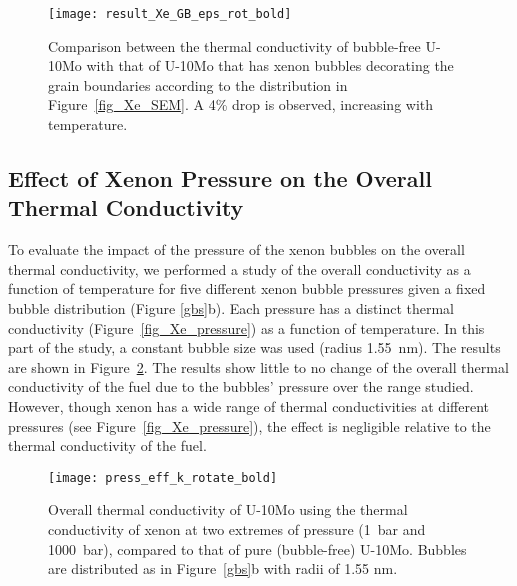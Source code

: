 \begin{figure}
	\centering
	\texttt{[image: result\_Xe\_GB\_eps\_rot\_bold]}
    \caption[Comparing thermal conductivities between the inclusion of GB xenon and withouth xenon]{Comparison between the thermal conductivity of bubble-free U-10Mo
      with that of U-10Mo that has xenon bubbles decorating the grain
      boundaries according to the distribution in Figure~\ref{fig_Xe_SEM}. A
      4\% drop is observed, increasing with temperature.}
	\label{fig_eff_K_GB}
\end{figure}

\subsection{Effect of Xenon Pressure on the Overall Thermal Conductivity}
\label{subsec:xenonpressure}
To evaluate the impact of the pressure of the xenon bubbles on the overall thermal conductivity, we performed a study of the overall conductivity as a function of temperature for five different xenon bubble pressures given a fixed bubble distribution (Figure \ref{gbs}b). Each pressure has a distinct thermal conductivity (Figure~\ref{fig_Xe_pressure}) as a function of temperature. In this part of the study, a constant bubble size was used (radius 1.55~nm). The results are shown in Figure~\ref{fig_press_K}. The results show little to no change of the overall thermal conductivity of the fuel due to the bubbles' pressure over the range studied. However, though xenon has a wide range of thermal conductivities at different pressures (see Figure~\ref{fig_Xe_pressure}), the effect is negligible relative to the thermal conductivity of the fuel. 


\begin{figure}
	\centering
	\texttt{[image: press\_eff\_k\_rotate\_bold]}
	\caption[Overall thermal conductivity of U-10Mo using the thermal 
        conductivity of xenon at two extremes of pressure
        (1~bar and 1000~bar)]{Overall thermal conductivity of U-10Mo using the thermal 
        conductivity of xenon at two extremes of pressure
        (1~bar and 1000~bar), compared to that of pure (bubble-free) U-10Mo. Bubbles are distributed as in Figure~\ref{gbs}b with radii of 1.55 nm.}
	\label{fig_press_K}
\end{figure}

